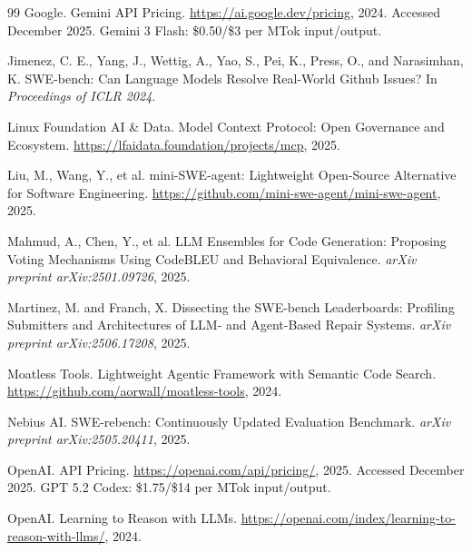 \documentclass[11pt,a4paper]{article}
\begin{document}
\begin{thebibliography}{99}
Google.
\newblock Gemini API Pricing.
\newblock \url{https://ai.google.dev/pricing}, 2024.
\newblock Accessed December 2025. Gemini 3 Flash: \$0.50/\$3 per MTok input/output.

Jimenez, C. E., Yang, J., Wettig, A., Yao, S., Pei, K., Press, O., and Narasimhan, K.
\newblock SWE-bench: Can Language Models Resolve Real-World Github Issues?
\newblock In \emph{Proceedings of ICLR 2024}.

Linux Foundation AI \& Data.
\newblock Model Context Protocol: Open Governance and Ecosystem.
\newblock \url{https://lfaidata.foundation/projects/mcp}, 2025.

Liu, M., Wang, Y., et al.
\newblock mini-SWE-agent: Lightweight Open-Source Alternative for Software Engineering.
\newblock \url{https://github.com/mini-swe-agent/mini-swe-agent}, 2025.

Mahmud, A., Chen, Y., et al.
\newblock LLM Ensembles for Code Generation: Proposing Voting Mechanisms Using CodeBLEU and Behavioral Equivalence.
\newblock \emph{arXiv preprint arXiv:2501.09726}, 2025.

Martinez, M. and Franch, X.
\newblock Dissecting the SWE-bench Leaderboards: Profiling Submitters and Architectures of LLM- and Agent-Based Repair Systems.
\newblock \emph{arXiv preprint arXiv:2506.17208}, 2025.

Moatless Tools.
\newblock Lightweight Agentic Framework with Semantic Code Search.
\newblock \url{https://github.com/aorwall/moatless-tools}, 2024.

Nebius AI.
\newblock SWE-rebench: Continuously Updated Evaluation Benchmark.
\newblock \emph{arXiv preprint arXiv:2505.20411}, 2025.

OpenAI.
\newblock API Pricing.
\newblock \url{https://openai.com/api/pricing/}, 2025.
\newblock Accessed December 2025. GPT 5.2 Codex: \$1.75/\$14 per MTok input/output.

OpenAI.
\newblock Learning to Reason with LLMs.
\newblock \url{https://openai.com/index/learning-to-reason-with-llms/}, 2024.


\end{thebibliography}
\end{document}
